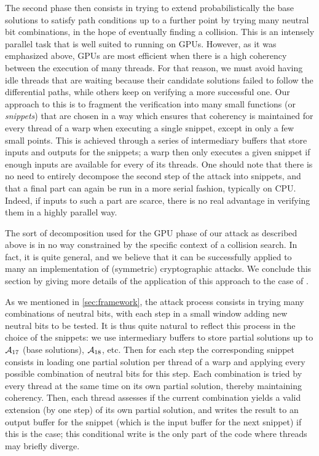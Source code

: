 The second phase then consists in trying to extend probabilistically the base solutions to satisfy path conditions up to a further point by
trying many neutral bit combinations, in the hope of eventually finding a collision.
This is an intensely parallel task that is well suited to running on GPUs. However, as it
was emphasized above, GPUs are most efficient when there is a high coherency between the execution of many threads. For that reason,
we must avoid having idle threads that are waiting because their candidate solutions failed to follow the differential paths, while
others keep on verifying a more successful one. Our approach to this is to fragment the verification into many small functions
(or \emph{snippets})
that are chosen in a way which ensures that coherency is maintained for every thread of a warp when executing a single snippet, except in
only a few small points. This is achieved through a series of intermediary buffers that store inputs and outputs for the snippets;
a warp then only executes a given snippet if enough inputs are available for every of its threads.
One should note that there is no need to entirely decompose the second step of the attack into snippets, and that a final part can again
be run in a more serial fashion, typically on CPU. Indeed, if inputs to such a part are scarce, there is no real advantage in verifying them in
a highly parallel way.


The sort of decomposition used for the GPU phase of our attack as described above is in no way constrained by the specific context of a \shaone collision search.
In fact, it is quite general, and we believe that it can be successfully applied to many an implementation of (symmetric) cryptographic
attacks. We conclude this section by giving more details of the application of this approach to the case of \shaone.


\bigskip

As we mentioned in \autoref{sec:framework}, the attack process consists in trying many combinations of neutral bits, with each step in a small window
adding new neutral bits to be tested. It is thus quite natural to reflect this process in the choice of the snippets:
we use intermediary buffers to store partial solutions up to $\mathcal{A}_{17}$ (\ie base solutions), $\mathcal{A}_{18}$, etc.
Then for each step the corresponding snippet consists
in loading one partial solution per thread of a warp and applying every possible combination of neutral bits for this step. Each combination
is tried by every thread at the same time on its own partial solution, thereby maintaining coherency.
Then, each thread assesses if the current combination yields a valid extension (by one step) of its own partial solution, and writes the result to
an output buffer for the snippet (which is the input buffer for the next snippet) if this is the case;
this conditional write is the only part of the code where threads may briefly diverge.

